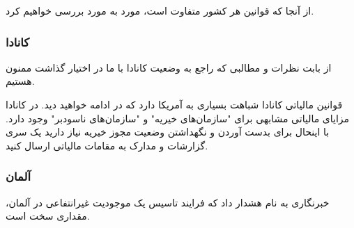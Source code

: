 از آنجا که قوانین هر کشور متفاوت است، مورد به مورد بررسی خواهیم کرد.
\subsubsection{کانادا}
از
بابت نظرات و مطالبی که راجع به وضعیت کانادا با ما در اختیار گذاشت ممنون هستیم.


قوانین مالیاتی کانادا شباهت بسیاری به آمریکا دارد که در ادامه خواهید دید.
در کانادا مزایای مالیاتی مشابهی برای "سازمان‌های خیریه" و "سازمان‌های ناسودبر"
وجود دارد. با اینحال برای بدست آوردن و نگهداشتن وضعیت مجوز خیریه نیاز دارید
یک سری گزارشات و مدارک به مقامات مالیاتی ارسال کنید.

\subsubsection{آلمان}

خبرنگاری به نام
هشدار داد که فرایند تاسیس یک موجودیت غیرانتفاعی در آلمان، مقداری سخت است.

